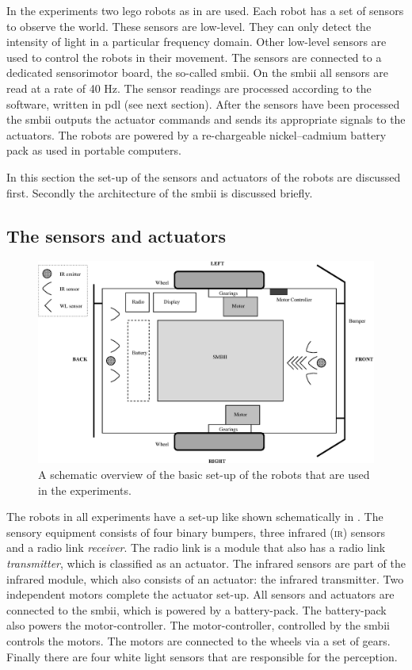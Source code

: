 In the experiments two {\sc lego} robots as in  are used. Each robot has a set of sensors to observe the world. These sensors are low-level. They can only detect the intensity of light in a particular frequency domain. Other low-level sensors are used to control the robots in their movement. The sensors are connected to a dedicated sensorimotor board, the so-called {\sc smbii}. On the {\sc smbii} all sensors are read at a rate of 40 Hz. The sensor readings are processed according to the software, written in {\sc pdl} (see next section). After the sensors have been processed the {\sc smbii} outputs the actuator commands and sends its appropriate signals to the actuators. The robots are powered by a re-chargeable nickel--cadmium battery pack as used in portable computers.

In this section the set-up of the sensors and actuators of the robots are discussed first. Secondly the architecture of the {\sc smbii} is discussed briefly.

\subsection{The sensors and actuators}\label{s:robots:sensors}

\begin{figure}[t]
\centerline{\includegraphics[width=\textwidth]{robots//schema_robots_exp2.eps}}
\caption{A schematic overview of the basic set-up of the robots that are used in the experiments.}
\label{f:robots:robots_general}
\end{figure}

The robots in all experiments have a set-up like shown schematically in . The sensory equipment consists of four binary bumpers, three infrared {\scshape (ir)} sensors and a radio link {\em receiver}. The radio link is a module that also has a radio link {\em transmitter}, which is classified as an actuator. The infrared sensors are part of the infrared module, which also consists of an actuator: the infrared transmitter. Two independent motors complete the actuator set-up. All sensors and actuators are connected to the {\sc smbii}, which is powered by a battery-pack. The battery-pack also powers the motor-controller. The motor-controller, controlled by the {\sc smbii} controls the motors. The motors are connected to the wheels via a set of gears. Finally there are four white light sensors that are responsible for the perception.

